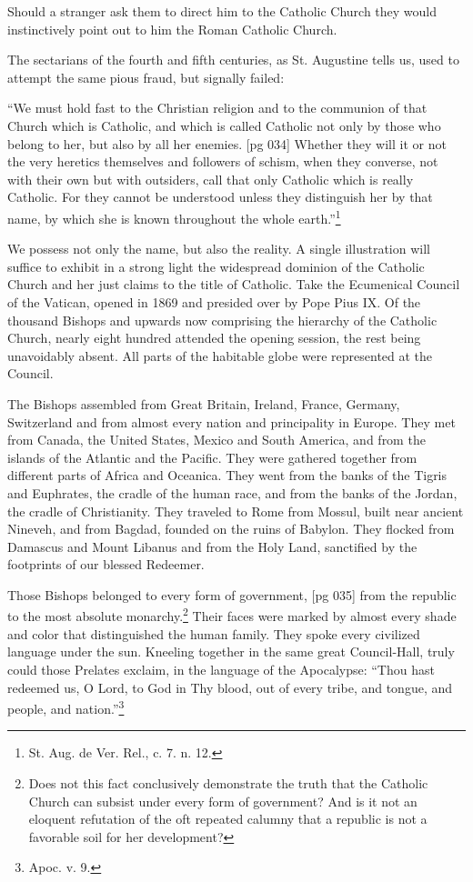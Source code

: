 Should a stranger ask them to direct him to the
Catholic Church they would instinctively point out
to him the Roman Catholic Church.

The sectarians of the fourth and fifth centuries,
as St. Augustine tells us, used to attempt the same
pious fraud, but signally failed:

“We must hold fast to the Christian religion
and to the communion of that Church which is
Catholic, and which is called Catholic not only by
those who belong to her, but also by all her enemies.
[pg 034]
Whether they will it or not the very heretics
themselves and followers of schism, when they
converse, not with their own but with outsiders,
call that only Catholic which is really Catholic.
For they cannot be understood unless they distinguish
her by that name, by which she is known
throughout the whole earth.”\footnote{St.
Aug. de Ver. Rel., c. 7. n. 12.}

We possess not only the name, but also the
reality. A single illustration will suffice to exhibit
in a strong light the widespread dominion of the
Catholic Church and her just claims to the title of
Catholic. Take the Ecumenical Council of the Vatican,
opened in 1869 and presided over by Pope
Pius IX. Of the thousand Bishops and upwards
now comprising the hierarchy of the Catholic
Church, nearly eight hundred attended the opening
session, the rest being unavoidably absent. All
parts of the habitable globe were represented at
the Council.

The Bishops assembled from Great Britain, Ireland,
France, Germany, Switzerland and from almost
every nation and principality in Europe.
They met from Canada, the United States, Mexico
and South America, and from the islands of the
Atlantic and the Pacific. They were gathered together
from different parts of Africa and Oceanica.
They went from the banks of the Tigris and
Euphrates, the cradle of the human race, and from
the banks of the Jordan, the cradle of Christianity.
They traveled to Rome from Mossul, built near
ancient Nineveh, and from Bagdad, founded on
the ruins of Babylon. They flocked from Damascus
and Mount Libanus and from the Holy Land,
sanctified by the footprints of our blessed Redeemer.

Those Bishops belonged to every form of government,
[pg 035]
from the republic to the most absolute
monarchy.\footnote{Does not this fact conclusively demonstrate the truth that
the Catholic Church can subsist under every form of government?
And is it not an eloquent refutation of the oft repeated
calumny that a republic is not a favorable soil for her
development?} Their faces were marked by almost
every shade and color that distinguished the human
family. They spoke every civilized language
under the sun. Kneeling together in the same
great Council-Hall, truly could those Prelates exclaim,
in the language of the Apocalypse: “Thou
hast redeemed us, O Lord, to God in Thy blood,
out of every tribe, and tongue, and people, and
nation.”\footnote{Apoc. v. 9.}

